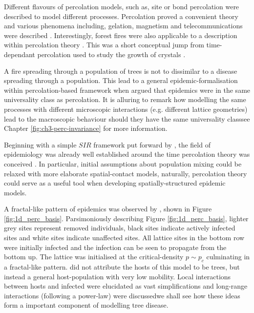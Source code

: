 Different flavours of percolation models, such as, site or bond percolation were described to model different processes. Percolation proved a convenient theory and various phenomena including, gelation, magnetism and telecommunications were described \cite{trove.nla.gov.au/work/26493727}. Interestingly, forest fires were also applicable to a description within percolation theory \cite{MacKay_1984}. This was a short conceptual jump from time-dependant percolation used to study the growth of crystals \cite{Family_1985}. 

A fire spreading through a population of trees is not to dissimilar to a disease spreading through a population. This lead to a general epidemic-formalisation within percolation-based framework when \cite{pub.1059067807} argued that epidemics were in the same universality class as percolation. It is alluring to remark how modelling the same processes with different microscopic interactions (e.g. different lattice geometries) lead to the macroscopic behaviour should they have the same universality class\textemdash see Chapter \ref{fig:ch3-perc-invariance} for more information.

Beginning with a simple $SIR$ framework put forward by \cite{kermack-model}, the field of epidemiology was already well established around the time percolation theory was conceived \cite{baily1975mathematical}. In particular, initial assumptions about population mixing could be relaxed with more elaborate spatial-contact models, naturally, percolation theory could serve as a useful tool when developing spatially-structured epidemic models.

A fractal-like pattern of epidemics was observed by \cite{GRASSBERGER1986273}, shown in Figure \ref{fig:1d_perc_basis}. Parsimoniously describing Figure \ref{fig:1d_perc_basis}, lighter grey sites represent removed individuals, black sites indicate actively infected sites and white sites indicate unaffected sites. All lattice sites in the bottom row were initially infected and the infection can be seen to propagate from the bottom up. The lattice was initialised at the critical-density $p\sim p_c$ culminating in a fractal-like pattern. \cite{GRASSBERGER1986273} did not attribute the hosts of this model to be trees, but instead a general host-population with very low mobility. Local interactions between hosts and infected were elucidated as vast simplifications and long-range interactions (following a power-law) were discussed\textemdash we shall see how these ideas form a important component of modelling tree disease.

